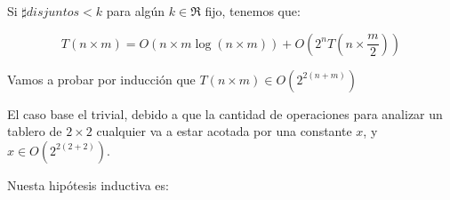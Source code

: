 \documentclass[a4paper, 12pt] {article}
\begin{document}
Si $\sharp disjuntos < k$ para alg\'un  $k \in \Re$  fijo, tenemos que:

\begin{equation} \label{eq:op_total_cota_disjuntos}
T\left( n \times m\right) = O\left( n\times m \log \left( n\times m\right) \right) + O \left( 2^{n}T\left( n \times \frac{m}{2} \right) \right) 
\end{equation}

Vamos a probar por inducci\'on que $\textstyle T\left( n \times m \right) \in O\left( 2^{2\left( n+m\right)  }\right)$


El caso base el trivial, debido a que la cantidad de operaciones para analizar un tablero de $2\times 2$ cualquier va a estar acotada por una constante $x$, y $ x \in O\left( 2^{2\left(2+2\right)} \right) $.


Nuesta hip\'otesis inductiva es:
\end{document}

